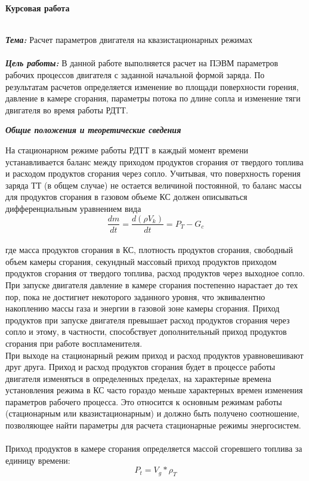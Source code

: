 \documentclass{article}
\begin{document}

\begin{center}
\textbf{Курсовая работа}\\
\end{center}
~\\
\textbf{\textit{Тема:}}
Расчет параметров двигателя на квазистационарных режимах\\
~\\
\textbf{\textit{Цель работы:}}
В данной работе выполняется расчет на ПЭВМ параметров рабочих процессов двигателя с заданной начальной формой заряда. По результатам расчетов определяется изменение во площади поверхности горения, давление в камере сгорания, параметры потока по длине сопла и изменение тяги двигателя во время работы РДТТ.
\begin{center}
\textbf{\textit{Общие положения и теоретические сведения}}

\end{center}
На стационарном режиме работы РДТТ в каждый момент времени устанавливается баланс между приходом продуктов сгорания от твердого топлива и расходом продуктов сгорания через сопло. Учитывая, что поверхность горения заряда ТТ (в общем случае) не остается величиной постоянной, то баланс массы для продуктов сгорания в газовом объеме КС должен описываться дифференциальным уравнением вида
\begin{equation}\label{eq:fourierrow} 
\frac{dm}{dt}= \frac{d(\rho V_k)}{dt} = P_T - G_c
\end{equation}\\
где масса продуктов сгорания в КС, плотность продуктов сгорания, свободный объем камеры сгорания, секундный массовый приход продуктов приходом продуктов сгорания от твердого топлива, расход продуктов через выходное сопло.\\
При запуске двигателя давление в камере сгорания постепенно нарастает до тех пор, пока не достигнет некоторого заданного уровня, что эквивалентно накоплению массы газа и энергии в газовой зоне камеры сгорания. Приход продуктов при запуске двигателя превышает расход продуктов сгорания через сопло и этому, в частности, способствует дополнительный приход продуктов сгорания при работе воспламенителя.\\
При выходе на стационарный режим приход и расход продуктов уравновешивают друг друга. Приход и расход продуктов сгорания будет в процессе работы двигателя изменяться в определенных пределах, на характерные времена установления режима в КС часто гораздо меньше характерных времен изменения параметров рабочего процесса. Это относится к основным режимам работы (стационарным или квазистационарным) и должно быть получено соотношение, позволяющее найти параметры для расчета стационарные режимы энергосистем.\\
~\\
Приход продуктов в камере сгорания определяется массой сгоревшего топлива за единицу времени: \\
\begin{equation}\label{eq:fourierrow} 
P_t = V_g * \rho_T 
\end{equation}\\
\end{document}
